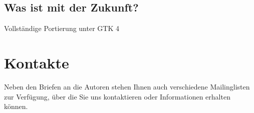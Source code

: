 \subsection{Was ist mit der Zukunft?}%

Vollständige Portierung unter \gls{GTK} 4%


\section{Kontakte\label{introduction-contacts}} 	%


Neben den Briefen an die Autoren stehen Ihnen auch verschiedene Mailinglisten zur Verfügung, über die Sie uns kontaktieren oder Informationen erhalten können.

